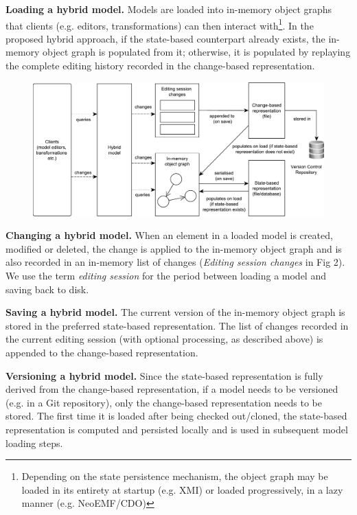 \documentclass{llncs}
\begin{document}
\textbf{Loading a hybrid model.} Models are loaded into in-memory object graphs that clients (e.g. editors, transformations) can then interact with\footnote{Depending on the state persistence mechanism, the object graph may be loaded in its entirety at startup (e.g. XMI) or loaded progressively, in a lazy manner (e.g. NeoEMF/CDO)}. In the proposed hybrid approach, if the state-based counterpart already exists, the in-memory object graph is populated from it; otherwise, it is populated by replaying the complete editing history recorded in the change-based representation.

\begin{figure}[t]
\includegraphics[width=\linewidth]{images/hybrid_persistence}
\label{fig:hybrid_persistence}
\end{figure}

\textbf{Changing a hybrid model.} When an element in a loaded model is created, modified or deleted, the change is applied to the in-memory object graph and is also recorded in an in-memory list of changes (\textit{Editing session changes} in Fig 2). We use the term \emph{editing session} for the period between loading a model and saving back to disk. 

\textbf{Saving a hybrid model.} The current version of the in-memory object graph is stored in the preferred state-based representation. The list of changes recorded in the current editing session (with optional processing, as described above) is appended to the change-based representation.

\textbf{Versioning a hybrid model.} Since the state-based representation is fully derived from the change-based representation, if a model needs to be versioned (e.g. in a Git repository), only the change-based representation needs to be stored. The first time it is loaded after being checked out/cloned, the state-based representation is computed and persisted locally and is used in subsequent model loading steps.
\end{document}
